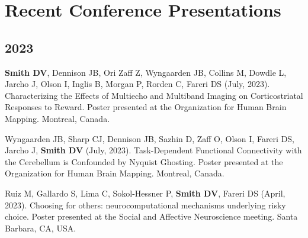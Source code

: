 \documentclass[11pt, letterpaper]{article}
\begin{document}

\section*{Recent Conference Presentations}
\label{sec:conferences}

\subsection*{2023}
\begin{hangparas}{.5in}{1}

\textbf{Smith DV}, Dennison JB, Ori Zaff Z, Wyngaarden JB, Collins M, Dowdle L, Jarcho J, Olson I, Inglis B, Morgan P, Rorden C, Fareri DS (July, 2023). Characterizing the Effects of Multiecho and Multiband Imaging on Corticostriatal Responses to Reward. Poster presented at the Organization for Human Brain Mapping. Montreal, Canada.

Wyngaarden JB, Sharp CJ, Dennison JB, Sazhin D, Zaff O, Olson I, Fareri DS, Jarcho J, \textbf{Smith DV} (July, 2023). Task-Dependent Functional Connectivity with the Cerebellum is Confounded by Nyquist Ghosting. Poster presented at the Organization for Human Brain Mapping. Montreal, Canada.

Ruiz M, Gallardo S, Lima C, Sokol-Hessner P, \textbf{Smith DV}, Fareri DS (April, 2023). Choosing for others: neurocomputational mechanisms underlying risky choice. Poster presented at the Social and Affective Neuroscience meeting. Santa Barbara, CA, USA.


\end{hangparas}
\end{document}

